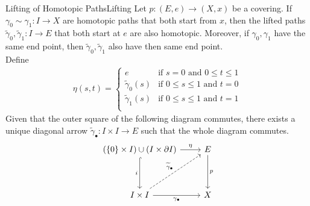\documentclass{report}
\begin{document}
\begin{proposition}{Lifting of Homotopic Paths}{Lifting}
	\label{my_proposition}
	Let $p: (E,e) \to (X,x)$ be a covering. If $\gamma_0 \sim \gamma_1: I \to X$ are homotopic paths that both start from $x$, then the lifted paths $\widetilde{\gamma}_0, \widetilde{\gamma}_1: I \to E$ that both start at $e$ are also homotopic. Moreover, if $\gamma_0,\gamma_1$ have the same end point, then $\widetilde{\gamma}_0, \widetilde{\gamma}_1$ also have then same end point.\\
	Define 
	\begin{align*}
		\eta(s,t)=\begin{cases}
			e & \text{if }s=0\text{ and }0\le t\le 1 \\
			\widetilde{\gamma}_0(s) & \text{if }0\le s\le 1 \text{ and }t=0\\
			\widetilde{\gamma}_1(s) & \text{if }0\le s\le 1 \text{ and }t=1\\
		\end{cases}
	\end{align*}
	Given that the outer square of the following diagram commutes, there exists a unique diagonal arrow $\widetilde{\gamma}_\bullet:I\times I\to E$ such that the whole diagram commutes.
	\[
	\begin{tikzcd}[ampersand replacement=\&]
		 (\{0\}\times I )\cup (I\times\partial I ) \arrow[r, "\eta"] \arrow[d, "i"', hook]                      \& E \arrow[d, "p"] \\ [+20pt]
		I \times I \arrow[r, "\gamma_\bullet"'] \arrow[ru, "\widetilde{\gamma}_\bullet", dashed] \& X               
	\end{tikzcd}
	\]
\end{proposition}
\end{document}
